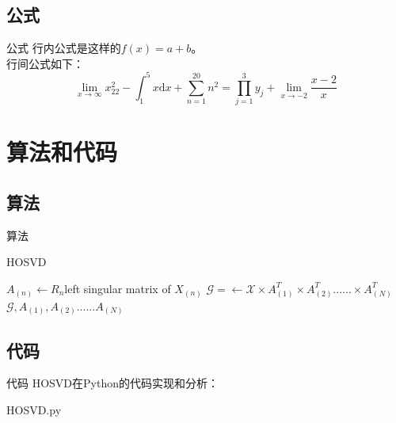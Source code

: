 \documentclass[10pt,aspectratio=43,mathserif,table]{beamer}
\begin{document}
\subsection{公式}
\begin{frame}{公式}
	行内公式是这样的$ f(x) = a+b $。\\
	行间公式如下：
	$$  \lim_{x \to \infty} x^2_{22} - \int_{1}^{5}x\mathrm{d}x + \sum_{n=1}^{20} n^{2} = \prod_{j=1}^{3} y_{j}  + \lim_{x \to -2} \frac{x-2}{x} $$
\end{frame}

\section{算法和代码}
\subsection{算法}
\begin{frame}{算法}
\begin{algorithm}[H]
	\caption{HOSVD}
	\small 
	
	{
		$A_{(n)}\leftarrow R_{n}$left singular matrix of $X_{(n)}$
	}
	$\mathcal{G}=\leftarrow \mathcal{X} \times A_{(1)}^{T} \times A_{(2)}^{T}...... \times A_{(N)}^{T}$\\
	\Return $\mathcal{G},A_{(1)},A_{(2)}......A_{(N)} $
\end{algorithm}
\end{frame}

\subsection{代码}
\begin{frame}[fragile]{代码}
HOSVD在Python的代码实现和分析：

{HOSVD.py}
\end{frame}
\end{document}
